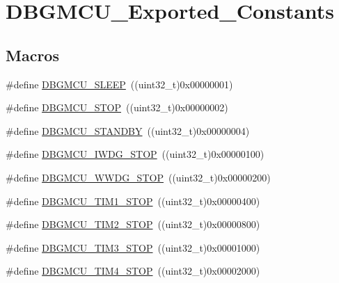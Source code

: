 \hypertarget{group___d_b_g_m_c_u___exported___constants}{}\section{D\+B\+G\+M\+C\+U\+\_\+\+Exported\+\_\+\+Constants}
\label{group___d_b_g_m_c_u___exported___constants}
\subsection*{Macros}
\begin{DoxyCompactItemize}
\item 
\#define \mbox{\hyperlink{group___d_b_g_m_c_u___exported___constants_ga1c457289646b9d9814b93fbb994c9930}{D\+B\+G\+M\+C\+U\+\_\+\+S\+L\+E\+EP}}~((uint32\+\_\+t)0x00000001)
\item 
\#define \mbox{\hyperlink{group___d_b_g_m_c_u___exported___constants_ga4a71bcfa6868672674b5410d2fd372f4}{D\+B\+G\+M\+C\+U\+\_\+\+S\+T\+OP}}~((uint32\+\_\+t)0x00000002)
\item 
\#define \mbox{\hyperlink{group___d_b_g_m_c_u___exported___constants_ga6eb848845f9207ffdccd0590da192002}{D\+B\+G\+M\+C\+U\+\_\+\+S\+T\+A\+N\+D\+BY}}~((uint32\+\_\+t)0x00000004)
\item 
\#define \mbox{\hyperlink{group___d_b_g_m_c_u___exported___constants_ga5b8b38b5589a2e26a57325553b5dfe23}{D\+B\+G\+M\+C\+U\+\_\+\+I\+W\+D\+G\+\_\+\+S\+T\+OP}}~((uint32\+\_\+t)0x00000100)
\item 
\#define \mbox{\hyperlink{group___d_b_g_m_c_u___exported___constants_ga9ecfb95a943e2ad165395fff4fa12770}{D\+B\+G\+M\+C\+U\+\_\+\+W\+W\+D\+G\+\_\+\+S\+T\+OP}}~((uint32\+\_\+t)0x00000200)
\item 
\#define \mbox{\hyperlink{group___d_b_g_m_c_u___exported___constants_ga017fb3101a3569426e82b066cb2f8848}{D\+B\+G\+M\+C\+U\+\_\+\+T\+I\+M1\+\_\+\+S\+T\+OP}}~((uint32\+\_\+t)0x00000400)
\item 
\#define \mbox{\hyperlink{group___d_b_g_m_c_u___exported___constants_ga8ba3a77260f748793c903468a4608bd1}{D\+B\+G\+M\+C\+U\+\_\+\+T\+I\+M2\+\_\+\+S\+T\+OP}}~((uint32\+\_\+t)0x00000800)
\item 
\#define \mbox{\hyperlink{group___d_b_g_m_c_u___exported___constants_ga28c01c2c30bed78e51d997007986fac9}{D\+B\+G\+M\+C\+U\+\_\+\+T\+I\+M3\+\_\+\+S\+T\+OP}}~((uint32\+\_\+t)0x00001000)
\item 
\#define \mbox{\hyperlink{group___d_b_g_m_c_u___exported___constants_gac87363a4018e2b23a907cfaf836494f1}{D\+B\+G\+M\+C\+U\+\_\+\+T\+I\+M4\+\_\+\+S\+T\+OP}}~((uint32\+\_\+t)0x00002000)

\end{DoxyCompactItemize}
